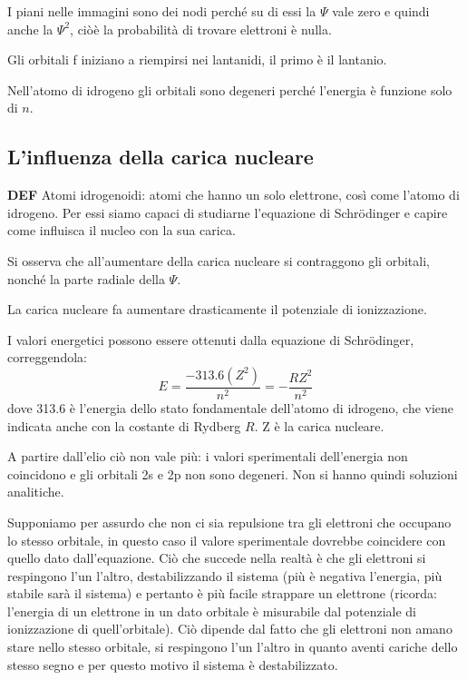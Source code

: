 I piani nelle immagini sono dei nodi perché su di essi la $\Psi$ vale zero e quindi anche la $\Psi^2$, ciòè la probabilità di trovare elettroni è nulla.

Gli orbitali f iniziano a riempirsi nei lantanidi, il primo è il lantanio.

Nell'atomo di idrogeno gli orbitali sono degeneri perché l'energia è funzione solo di $n$.
\subsection{L'influenza della carica nucleare}
\textbf{DEF} Atomi idrogenoidi: atomi che hanno un solo elettrone, così come l'atomo di idrogeno. Per essi siamo capaci di studiarne l'equazione di Schrödinger e capire come influisca il nucleo con la sua carica.

Si osserva che all'aumentare della carica nucleare si contraggono gli orbitali, nonché la parte radiale della $\Psi$.

La carica nucleare fa aumentare drasticamente il potenziale di ionizzazione.

I valori energetici possono essere ottenuti dalla equazione di Schrödinger, correggendola:
$$E=\frac{-313.6(Z^2)}{n^2}=-\frac{RZ^2}{n^2}$$
dove 313.6 è l'energia dello stato fondamentale dell'atomo di idrogeno, che viene indicata anche con la costante di Rydberg $R$. Z è la carica nucleare.

A partire dall'elio ciò non vale più: i valori sperimentali dell'energia non coincidono e gli orbitali 2s e 2p non sono degeneri. Non si hanno quindi soluzioni analitiche.

Supponiamo per assurdo che non ci sia repulsione tra gli elettroni che occupano lo stesso orbitale, in questo caso il valore sperimentale dovrebbe coincidere con quello dato dall'equazione. Ciò che succede nella realtà è che gli elettroni si respingono l'un l'altro, destabilizzando il sistema (più è negativa l'energia, più stabile sarà il sistema) e pertanto è più facile strappare un elettrone (ricorda: l'energia di un elettrone in un dato orbitale è misurabile dal potenziale di ionizzazione di quell'orbitale). Ciò dipende dal fatto che gli elettroni non amano stare nello stesso orbitale, si respingono l'un l'altro in quanto aventi cariche dello stesso segno e per questo motivo il sistema è destabilizzato.
